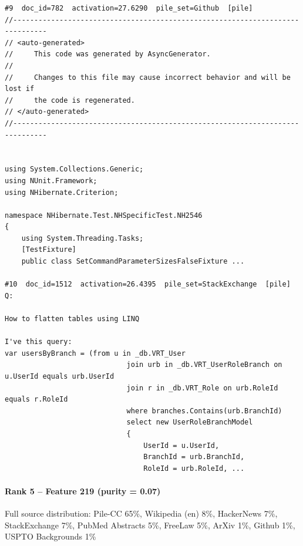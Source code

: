 \begin{verbatim}
#9  doc_id=782  activation=27.6290  pile_set=Github  [pile]
﻿//------------------------------------------------------------------------------
// <auto-generated>
//     This code was generated by AsyncGenerator.
//
//     Changes to this file may cause incorrect behavior and will be lost if
//     the code is regenerated.
// </auto-generated>
//------------------------------------------------------------------------------


using System.Collections.Generic;
using NUnit.Framework;
using NHibernate.Criterion;

namespace NHibernate.Test.NHSpecificTest.NH2546
{
	using System.Threading.Tasks;
	[TestFixture]
	public class SetCommandParameterSizesFalseFixture ...

#10  doc_id=1512  activation=26.4395  pile_set=StackExchange  [pile]
Q:

How to flatten tables using LINQ

I've this query:
var usersByBranch = (from u in _db.VRT_User
                             join urb in _db.VRT_UserRoleBranch on u.UserId equals urb.UserId
                             join r in _db.VRT_Role on urb.RoleId equals r.RoleId
                             where branches.Contains(urb.BranchId)
                             select new UserRoleBranchModel
                             {
                                 UserId = u.UserId,
                                 BranchId = urb.BranchId,
                                 RoleId = urb.RoleId, ...

\end{verbatim}

\paragraph*{Rank 5 -- Feature 219 (purity = 0.07)}

Full source distribution: Pile-CC 65\%, Wikipedia (en) 8\%, HackerNews 7\%, StackExchange 7\%, PubMed Abstracts 5\%, FreeLaw 5\%, ArXiv 1\%, Github 1\%, USPTO Backgrounds 1\%

